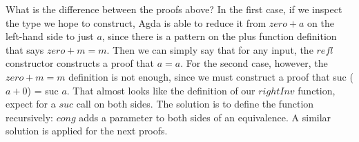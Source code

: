 {\begin{code}%
\>[0]\AgdaSpace{}%
\AgdaSymbol{:}\AgdaSpace{}%
\AgdaSymbol{(}\AgdaSpace{}%
\AgdaSymbol{:}\AgdaSpace{}%
\AgdaSymbol{)}\AgdaSpace{}%
\AgdaSpace{}%
\AgdaSpace{}%
\AgdaOperator{\AgdaPrimitive{+}}\AgdaSpace{}%
\AgdaSpace{}%
\AgdaSpace{}%
\<%
\\
\>[0]\AgdaSpace{}%
\AgdaSpace{}%
\AgdaSymbol{=}\AgdaSpace{}%
\<%
\\
%
\\[\AgdaEmptyExtraSkip]%
\>[0]\AgdaSpace{}%
\AgdaSymbol{:}\AgdaSpace{}%
\AgdaSymbol{(}\AgdaSpace{}%
\AgdaSymbol{:}\AgdaSpace{}%
\AgdaSymbol{)}\AgdaSpace{}%
\AgdaSpace{}%
\AgdaSpace{}%
\AgdaOperator{\AgdaPrimitive{+}}\AgdaSpace{}%
\AgdaSpace{}%
\AgdaSpace{}%
\<%
\\
\>[0]\AgdaSpace{}%
\AgdaSpace{}%
\AgdaSymbol{=}\AgdaSpace{}%
\<%
\\
\>[0]\AgdaSpace{}%
\AgdaSymbol{(}\AgdaSpace{}%
\AgdaSymbol{)}\AgdaSpace{}%
\AgdaSymbol{=}\AgdaSpace{}%
\AgdaSpace{}%
\AgdaSpace{}%
\AgdaSymbol{(}\AgdaSpace{}%
\AgdaSymbol{)}\<%
\end{code}

What is the difference between the proofs above? In the first case, if we inspect the type we hope to construct, Agda is able to reduce it from $zero + a$ on the left-hand side to just $a$, since there is a pattern on the plus function definition that says $zero + m = m$. Then we can simply say that for any input, the $refl$ constructor constructs a proof that \begin{math}a = a\end{math}.
For the second case, however, the $zero + m = m$ definition is not enough, since we must construct a proof that suc ($a + 0$) = suc $a$. That almost looks like the definition of our $rightInv$ function, expect for a $suc$ call on both sides. The solution is to define the function recursively: $cong$ adds a parameter to both sides of an equivalence. A similar solution is applied for the next proofs.

}
